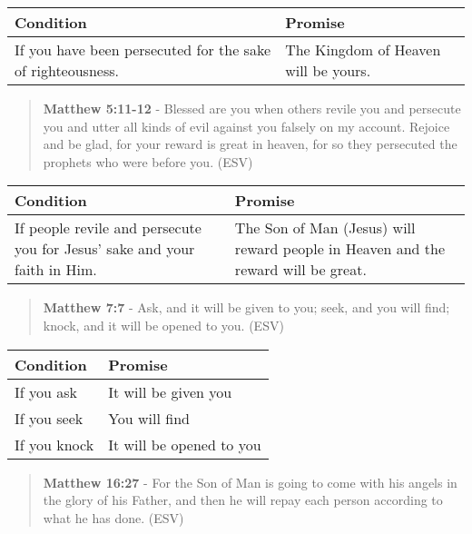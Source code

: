 \documentclass[11pt]{article}
\begin{document}
\begin{center}
\begin{tabular}{ll}
Condition & Promise\\[0pt]
\hline
If you have been persecuted for the sake of righteousness. & The Kingdom of Heaven will be yours.\\[0pt]
\end{tabular}
\end{center}

\begin{quote}
\textbf{Matthew 5:11-12} - Blessed are you when others revile you and persecute you and utter all kinds of evil against you falsely on my account. Rejoice and be glad, for your reward is great in heaven, for so they persecuted the prophets who were before you. (ESV)
\end{quote}

\begin{center}
\begin{tabular}{ll}
Condition & Promise\\[0pt]
\hline
If people revile and persecute you for Jesus' sake and your faith in Him. & The Son of Man (Jesus) will reward people in Heaven and the reward will be great.\\[0pt]
\end{tabular}
\end{center}

\begin{quote}
\textbf{Matthew 7:7} - Ask, and it will be given to you; seek, and you will find; knock, and it will be opened to you. (ESV)
\end{quote}

\begin{center}
\begin{tabular}{ll}
Condition & Promise\\[0pt]
\hline
If you ask & It will be given you\\[0pt]
If you seek & You will find\\[0pt]
If you knock & It will be opened to you\\[0pt]
\end{tabular}
\end{center}

\begin{quote}
\textbf{Matthew 16:27} - For the Son of Man is going to come with his angels in the glory of his Father, and then he will repay each person according to what he has done. (ESV)
\end{quote}
\end{document}
